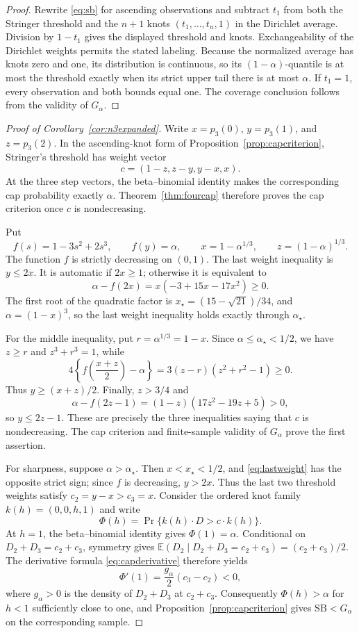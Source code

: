 \documentclass[11pt]{article}
\theoremstyle{definition}
\newcommand{\SB}{\mathrm{SB}}
\newcommand{\E}{\mathbb{E}}
\begin{document}
\begin{proof}
Rewrite \eqref{eq:sb} for ascending observations and subtract $t_1$ from
both the Stringer threshold and the $n+1$ knots
$(t_1,\ldots,t_n,1)$ in the Dirichlet average. Division by $1-t_1$
gives the displayed threshold and knots. Exchangeability of the Dirichlet
weights permits the stated labeling. Because the normalized average has
knots zero and one, its distribution is continuous, so its
$(1-\alpha)$-quantile is at most the threshold exactly when its strict
upper tail there is at most $\alpha$. If $t_1=1$, every observation and
both bounds equal one. The coverage conclusion follows from the validity
of $G_\alpha$.
\end{proof}

\begin{proof}[Proof of Corollary~\ref{cor:n3expanded}]
Write $x=p_3(0)$, $y=p_3(1)$, and $z=p_3(2)$.  In the ascending-knot form of
Proposition~\ref{prop:capcriterion}, Stringer's threshold has weight vector
\[
 c=(1-z,z-y,y-x,x).
\]
At the three step vectors, the beta--binomial identity makes the corresponding
cap probability exactly $\alpha$.  Theorem~\ref{thm:fourcap} therefore proves
the cap criterion once $c$ is nondecreasing.

Put
\[
 f(s)=1-3s^2+2s^3,\qquad f(y)=\alpha,\qquad
 x=1-\alpha^{1/3},\qquad z=(1-\alpha)^{1/3}.
\]
The function $f$ is strictly decreasing on $(0,1)$.  The last weight
inequality is $y\le2x$.  It is automatic if $2x\ge1$; otherwise it is
equivalent to
\begin{equation}\label{eq:lastweight}
 \alpha-f(2x)=x(-3+15x-17x^2)\ge0.
\end{equation}
The first root of the quadratic factor is
$x_\star=(15-\sqrt{21})/34$, and $\alpha=(1-x)^3$, so
the last weight inequality holds exactly through $\alpha_\star$.

For the middle inequality, put $r=\alpha^{1/3}=1-x$.  Since
$\alpha\le\alpha_\star<1/2$, we have $z\ge r$ and $z^3+r^3=1$, while
\[
 4\left\{f\left(\frac{x+z}{2}\right)-\alpha\right\}
 =3(z-r)(z^2+r^2-1)\ge0.
\]
Thus $y\ge(x+z)/2$.  Finally, $z>3/4$ and
\[
 \alpha-f(2z-1)=(1-z)(17z^2-19z+5)>0,
\]
so $y\le2z-1$.  These are precisely the three inequalities saying that $c$
is nondecreasing.  The cap criterion and finite-sample validity of $G_\alpha$
prove the first assertion.

For sharpness, suppose $\alpha>\alpha_\star$.  Then
$x<x_\star<1/2$, and \eqref{eq:lastweight} has the opposite strict sign;
since $f$ is decreasing, $y>2x$.  Thus the last two threshold weights satisfy
$c_2=y-x>c_3=x$.  Consider the ordered knot family
$k(h)=(0,0,h,1)$ and write
\[
 \Phi(h)=\Pr\{k(h)\mathbin{\cdot}D>c\mathbin{\cdot}k(h)\}.
\]
At $h=1$, the beta--binomial identity gives $\Phi(1)=\alpha$.
Conditional on $D_2+D_3=c_2+c_3$, symmetry gives
$\E(D_2\mid D_2+D_3=c_2+c_3)=(c_2+c_3)/2$.  The derivative formula
\eqref{eq:capderivative} therefore yields
\[
 \Phi'(1)=\frac{g_\alpha}{2}(c_3-c_2)<0,
\]
where $g_\alpha>0$ is the density of $D_2+D_3$ at $c_2+c_3$.
Consequently $\Phi(h)>\alpha$ for $h<1$ sufficiently close to one, and
Proposition~\ref{prop:capcriterion} gives $\SB<G_\alpha$ on the corresponding
sample.
\end{proof}
\end{document}
